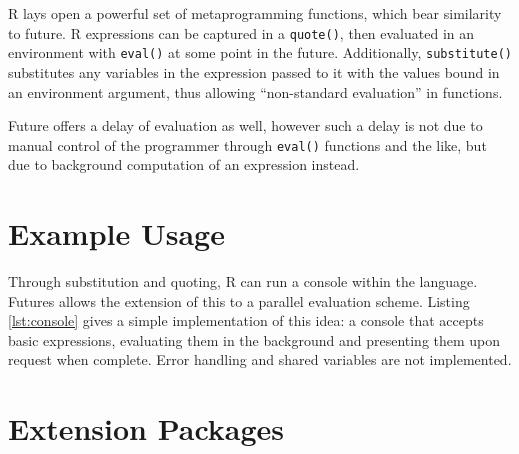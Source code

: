 \documentclass[10pt,a4paper]{article}
\begin{document}
R lays open a powerful set of metaprogramming functions, which bear
similarity to future. R expressions can be captured in a
\texttt{quote()}, then evaluated in an environment with \texttt{eval()}
at some point in the future. Additionally, \texttt{substitute()}
substitutes any variables in the expression passed to it with the
values bound in an environment argument, thus allowing ``non-standard
evaluation'' in functions.

Future offers a delay of evaluation as well, however such a delay is
not due to manual control of the programmer through \texttt{eval()}
functions and the like, but due to background computation of an
expression instead.

\section{Example Usage}
\label{sec:examples}

Through substitution and quoting, R can run a console within the
language. Futures allows the extension of this to a parallel
evaluation scheme. Listing \ref{lst:console} gives a simple implementation
of this idea: a console that accepts basic expressions, evaluating
them in the background and presenting them upon request when complete.
Error handling and shared variables are not implemented.



\section{Extension Packages}
\label{sec:extension-packages}
\end{document}
